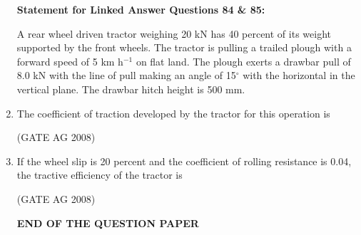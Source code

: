 \documentclass[journal,12pt,onecolumn]{IEEEtran}
\begin{document}
\begin{enumerate}
\textbf{Statement for Linked Answer Questions 84 \& 85:}

A rear wheel driven tractor weighing 20 kN has 40 percent of its weight supported by the front wheels. The tractor is pulling a trailed plough with a forward speed of 5 km h$^{-1}$ on flat land. The plough exerts a drawbar pull of 8.0 kN with the line of pull making an angle of 15$^\circ$ with the horizontal in the vertical plane. The drawbar hitch height is 500 mm.


\item 
 The coefficient of traction developed by the tractor for this operation is
\begin{enumerate}
\end{enumerate}
\hfill(GATE AG 2008)\\

\medskip

\item 
 If the wheel slip is 20 percent and the coefficient of rolling resistance is 0.04, the tractive efficiency of the tractor is
\begin{enumerate}
\end{enumerate}
\hfill(GATE AG 2008)\\

\medskip

\begin{center}
\textbf{END OF THE QUESTION PAPER}
\end{center}

\end{enumerate}
\end{document}
